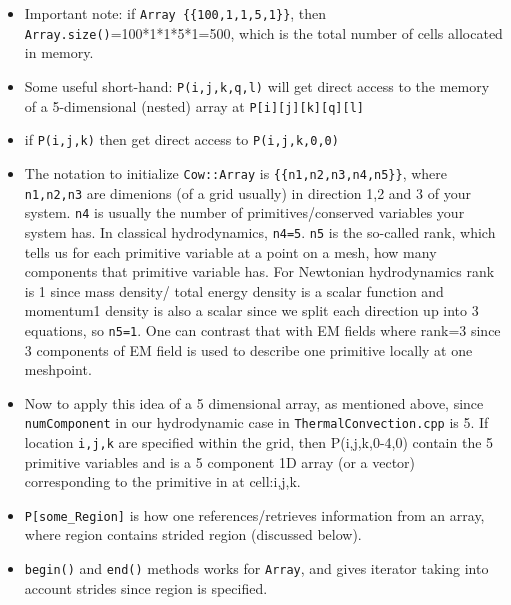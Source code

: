 \documentclass{article}
\begin{document}
\begin{itemize}
\begin{itemize}
		\item Important note: if \texttt{Array \{\{100,1,1,5,1\}\}}, then \texttt{Array.size()}=100*1*1*5*1=500, which is the total number of cells allocated in memory.
		\item Some useful short-hand: \texttt{P(i,j,k,q,l)} will get direct access to the memory of a 5-dimensional (nested) array at \texttt{P[i][j][k][q][l]}
		\item if \texttt{P(i,j,k)} then get direct access to \texttt{P(i,j,k,0,0)}
		\item The notation to initialize \texttt{Cow::Array} is \texttt{\{\{n1,n2,n3,n4,n5\}\}}, where \texttt{n1,n2,n3} are dimenions (of a grid usually) in direction 1,2 and 3 of your system. \texttt{n4} is usually the number of primitives/conserved variables your system has. In classical hydrodynamics, \texttt{n4=5}. \texttt{n5} is the so-called rank, which tells us for each primitive variable at a point on a mesh, how many components that primitive variable has. For Newtonian hydrodynamics rank is 1 since mass density/ total energy density is a scalar function and momentum1 density is also a scalar since we split each direction up into 3 equations, so \texttt{n5=1}. One can contrast that with EM fields where rank=3 since 3 components of EM field is used to describe one primitive locally at one meshpoint.
		\item Now to apply this idea of a 5 dimensional array, as mentioned above, since \texttt{numComponent} in our hydrodynamic case in \texttt{ThermalConvection.cpp} is 5. If location \texttt{i,j,k} are specified within the grid, then P(i,j,k,0-4,0) contain the 5 primitive variables and is a 5 component 1D array (or a vector) corresponding to the primitive in at cell:i,j,k.
		\item \texttt{P[some\_Region]} is how one references/retrieves information from an array, where region contains strided region (discussed below).
		\item \texttt{begin()} and \texttt{end()} methods works for \texttt{Array}, and gives iterator taking into account strides since region is specified.
		


\end{itemize}
\end{itemize}
\end{document}
